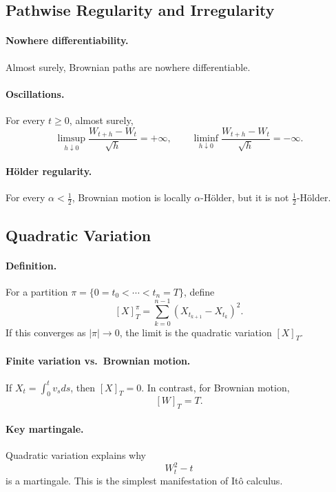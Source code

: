 \documentclass[11pt]{article}
\newcommand{\1}{\mathbf{1}}
\theoremstyle{plain}
\theoremstyle{definition}
\theoremstyle{remark}
\begin{document}
\subsection{Pathwise Regularity and Irregularity}

\paragraph{Nowhere differentiability.}
Almost surely, Brownian paths are nowhere differentiable.

\paragraph{Oscillations.}
For every $t\ge0$, almost surely,
\[
\limsup_{h\downarrow0}\frac{W_{t+h}-W_t}{\sqrt{h}}=+\infty,
\qquad
\liminf_{h\downarrow0}\frac{W_{t+h}-W_t}{\sqrt{h}}=-\infty.
\]

\paragraph{Hölder regularity.}
For every $\alpha<\tfrac12$, Brownian motion is locally $\alpha$-Hölder,
but it is not $\tfrac12$-Hölder.

\subsection{Quadratic Variation}

\paragraph{Definition.}
For a partition $\pi=\{0=t_0<\cdots<t_n=T\}$, define
\[
[X]^\pi_T=\sum_{k=0}^{n-1}(X_{t_{k+1}}-X_{t_k})^2.
\]
If this converges as $|\pi|\to0$, the limit is the quadratic variation $[X]_T$.

\paragraph{Finite variation vs.\ Brownian motion.}
If $X_t=\int_0^t v_s ds$, then $[X]_T=0$.
In contrast, for Brownian motion,
\[
[W]_T=T.
\]

\paragraph{Key martingale.}
Quadratic variation explains why
\[
W_t^2-t
\]
is a martingale.
This is the simplest manifestation of Itô calculus.
\end{document}
